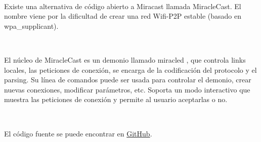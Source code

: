 \

Existe una alternativa de código abierto a Miracast llamada MiracleCast. El nombre viene por la dificultad de crear una red Wifi-P2P estable (basado en wpa_supplicant).

\

El núcleo de MiracleCast es un demonio llamado miracled \cite{MiracleCast}, que controla links locales, las peticiones de conexión, se encarga de la codificación del protocolo y el parsing.
Su línea de comandos puede ser usada para controlar el demonio, crear nuevas conexiones, modificar parámetros, etc.
Soporta un modo interactivo que muestra las peticiones de conexión y permite al usuario aceptarlas o no.

\

El código fuente se puede encontrar en \href{https://github.com/albfan/miraclecast}{GitHub}.
